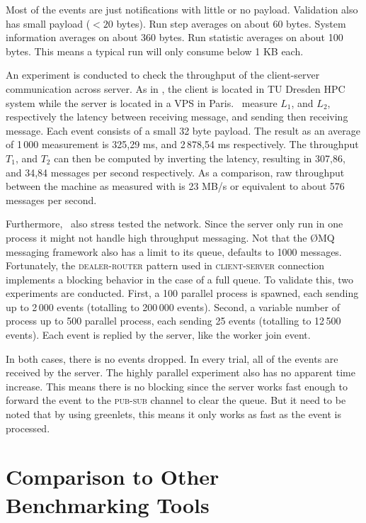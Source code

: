 Most of the events are just notifications with little or no payload.
Validation also has small payload ($< 20$ bytes).
Run step averages on about 60 bytes.
System information averages on about 360 bytes.
Run statistic averages on about 100 bytes.
This means a typical run will only consume below 1 KB each.

An experiment is conducted to check the throughput of the client-server communication across server.
As in , the client is located in TU Dresden HPC system while the server is located in a VPS in Paris.
\First~measure \(L_1\), and \(L_2\), respectively the latency between receiving message, and sending then receiving message.
Each event consists of a small 32 byte payload.
The result as an average of 1\,000 measurement is 325,29 ms, and 2\,878,54 ms respectively.
The throughput \(T_1\), and \(T_2\) can then be computed by inverting the latency, resulting in 307,86, and 34,84 messages per second respectively.
As a comparison, raw throughput between the machine as measured with  is 23 MB/s or equivalent to about 576 messages per second.

Furthermore, \first~also stress tested the network.
Since the server only run in one process it might not handle high throughput messaging.
Not that the \O MQ messaging framework also has a limit to its queue, defaults to 1000 messages.
Fortunately, the \textsc{dealer-router} pattern used in \textsc{client}-\textsc{server} connection implements a blocking behavior in the case of a full queue.
To validate this, two experiments are conducted.
First, a 100 parallel process is spawned, each sending up to 2\,000 events (totalling to 200\,000 events).
Second, a variable number of process up to 500 parallel process, each sending 25 events (totalling to 12\,500 events).
Each event is replied by the server, like the worker join event.

In both cases, there is no events dropped.
In every trial, all of the events are received by the server.
The highly parallel experiment also has no apparent time increase.
This means there is no blocking since the server works fast enough to forward the event to the \textsc{pub}-\textsc{sub} channel to clear the queue.
But it need to be noted that by using greenlets, this means it only works as fast as the event is processed.

\section{Comparison to Other Benchmarking Tools}
\label{sec:prior_works.method}


